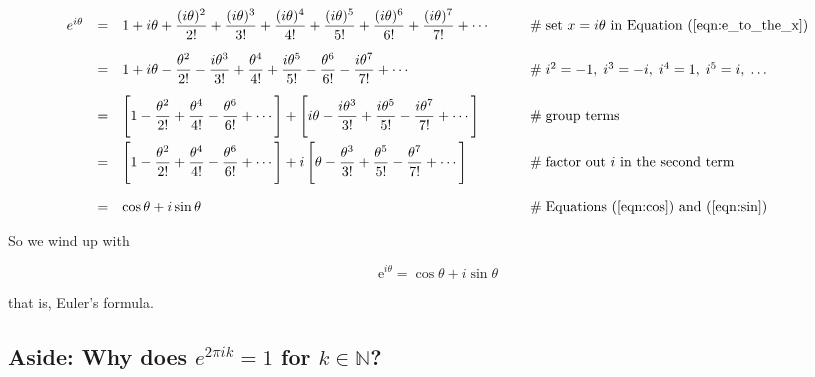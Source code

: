 \documentclass{article}
\theoremstyle{definition}
\begin{document}
\bigskip
\begin{equation*}
\begin{array}{lllll}
e^{i\theta}
&=& {\displaystyle 1 + i\theta +  \frac{(i\theta)^2}{2!} +
                   \frac{(i\theta)^3}{3!} + \frac{(i\theta)^4}{4!} +
                   \frac{(i\theta)^5}{5!} + \frac{(i\theta)^6}{6!} +
                   \frac{(i\theta)^7}{7!} + \cdots}    
        &\qquad \mathrel{\#} \text{set $x = i\theta$ in Equation (\ref{eqn:e_to_the_x})}  \\
[13pt]
&=& {\displaystyle 1 +  i\theta -  \frac{\theta^2}{2!} -  \frac{i
                   \theta^3}{3!} + \frac{\theta^4}{4!}  + \frac{i \theta^5}{5!} -
                   \frac{\theta^6}{6!} - \frac{i \theta^7}{7!}  + \cdots}
        &\qquad \mathrel{\#} i^2 = -1, \;  i^3 = -i, \; i^4 = 1, \;  i^5 = i, \; \hdots \\
[12pt]
&=& {\displaystyle \left [ 1 -  \frac{\theta^2}{2!}  +
                   \frac{\theta^4}{4!} - \frac{\theta^6}{6!} + \cdots  \right ]+
                   \left [ i\theta  - \frac{i \theta^3}{3!} + \frac{i \theta^5}{5!}
                   - \frac{i \theta^7}{7!} + \cdots \right ]}                  
        &\qquad \mathrel{\#} \text{group terms} \\
[12pt]
&=& {\displaystyle  \left [ 1 -  \frac{\theta^2}{2!}  +
                    \frac{\theta^4}{4!} - \frac{\theta^6}{6!} +
                    \cdots  \right ]+ i \left [ \theta  -
                    \frac{\theta^3}{3!} + \frac{\theta^5}{5!} -
                    \frac{\theta^7}{7!} + \cdots \right ]}                   
        &\qquad \mathrel{\#} \text{factor out $i$ in the second term} \\
[20pt]
&=& {\displaystyle \cos \theta + i \sin \theta}
        &\qquad \mathrel{\#} \text{Equations (\ref{eqn:cos}) and (\ref{eqn:sin})}
\end{array}
\end{equation*}

\bigskip
\noindent
So we wind up with

\bigskip
\begin{equation}
\mathrm{e}^{i\theta} = \cos \theta + i \sin \theta
\label{eqn:eulers_formula}
\end{equation}

\bigskip
\noindent
that is, Euler's formula.

\subsection{Aside: Why does $e^{2\pi ik} =1$ for $k \in \mathbb{N}$?}
\label{subsection:e_to_the_2pik_equals_one}
\end{document}
